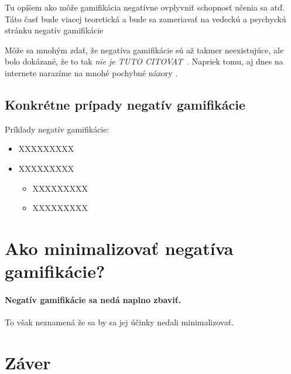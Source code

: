 \documentclass[10pt,oneside,slovak,a4paper]{article}
\begin{document}
Tu opíšem ako môže gamifikácia negatívne ovplyvniť schopnosť učenia sa atď.
Táto časť bude viacej teoretická a bude sa zameriavať na vedeckú a psychyckú stránku negatív gamifikácie

Môže sa mnohým zdať, že negatíva gamifikácie sú až takmer neexistujúce, ale bolo dokázané, že to tak \emph{nie je TUTO CITOVAT}~\cite{Czarnecki:Staged, Czarnecki:Progress}. Napriek tomu, aj dnes na internete narazíme na mnohé pochybné názory \cite{PLP-Framework}.


\subsection{Konkrétne prípady negatív gamifikácie} \label{NegativnePriklady}

Príklady negatív gamifikácie:

\begin{itemize}
\item XXXXXXXXX
\item XXXXXXXXX
	\begin{itemize}
	\item XXXXXXXXX
	\item XXXXXXXXX
	\end{itemize}
\end{itemize}


\section{Ako minimalizovať negatíva gamifikácie?} \label{MinimalizovanieNegatGamif}

\paragraph{Negatív gamifikácie sa nedá naplno zbaviť.}
To však neznamená že sa by sa jej účinky nedali minimalizovať.


\section{Záver} \label{Zaver} %






\end{document}
